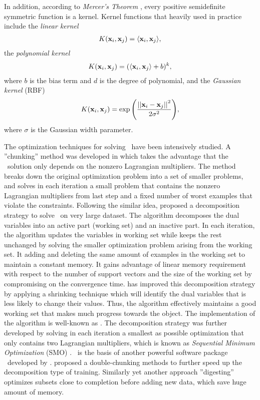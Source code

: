 {In addition, according to \textit{Mercer's Theorem} \citep{taylor04}, every positive semidefinite symmetric function is a kernel.
Kernel functions that heavily used in practice include the \textit{linear kernel}
\begin{align*}
	K(\mathbf {x}_i,\mathbf {x}_j) = \langle \mathbf {x}_i, \mathbf {x}_j \rangle,
\end{align*}
the \textit{polynomial kernel}
\begin{align*}
	K(\mathbf {x}_i,\mathbf {x}_j) = (\langle \mathbf {x}_i, \mathbf {x}_j \rangle + b)^k,
\end{align*}
where $b$ is the bias term and $d$ is the degree of polynomial, and the \textit{Gaussian kernel} (RBF)
\begin{align*}
	K(\mathbf {x}_i,\mathbf {x}_j) = \exp{\left(\frac{\left|\left| {\mathbf {x}_i}-{\mathbf {x}_j} \right|\right|^2}{2\sigma^2}\right)},
\end{align*}
where $\sigma$ is the Gaussian width parameter.

The optimization techniques for solving \svm\ have been intensively studied.
A ''chunking'' method was developed in \citep{Vapnik82estimation} which takes the advantage that the \svm\ solution only depends on the nonzero Lagrangian multipliers.
The method breaks down the original optimization problem into a set of smaller problems, and solves in each iteration a small problem that contains the nonzero Lagrangian multipliers from last step and a fixed number of worst examples that violate the constraints.
Following the similar idea, \citet{Osuna97an} proposed a decomposition strategy to solve \svm\ on very large dataset.
The algorithm decomposes the dual variables into an active part (working set) and an inactive part.
In each iteration, the algorithm updates the variables in working set while keeps the rest unchanged by solving the smaller optimization problem arising from the working set.
It adding and deleting the same amount of examples in the working set to maintain a constant memory.
It gains advantage of linear memory requirement with respect to the number of support vectors and the size of the working set by compromising on the convergence time.
\citep{Joachims98making} has improved this decomposition strategy by applying a shrinking technique which will identify the dual variables that is less likely to change their values.
Thus, the algorithm effectively maintains a good working set that makes much progress towards the object.
The implementation of the algorithm is well-known as \svmlight.
The decomposition strategy was further developed by solving in each iteration a smallest as possible optimization that only contains two Lagrangian multipliers, which is known as \textit{Sequential Minimum Optimization} (SMO) \citep{Platt98sequential,Platt99fast}.
\smo\ is the basis of another powerful software package \libsvm\ developed by \citet{Chang11libsvm}.
\citet{Perezcruz04double} proposed a double-chunking methods to further speed up the decomposition type of training. 
Similarly yet another approach ''digesting'' \citep{Decoste02support} optimizes subsets close to completion before adding new data, which save huge amount of memory.

}
